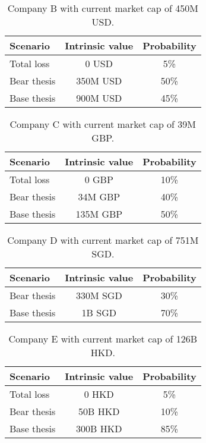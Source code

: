 \documentclass{article}
\begin{document}
\begin{table}[!b]
\caption{Company B with current market cap of 450M USD.}
\vspace{0.25cm}
\centering
\begin{tabular}{l|c|c}
Scenario & Intrinsic value & Probability \\
\hline
Total loss& 0 USD & 5\% \\
Bear thesis & 350M USD & 50\% \\
Base thesis & 900M USD & 45\% \\
\end{tabular}%
\label{tab:companyB}%
\end{table}%

\begin{table}[!b]
\caption{Company C with current market cap of 39M GBP.}
\vspace{0.25cm}
\centering
\begin{tabular}{l|c|c}
Scenario & Intrinsic value & Probability \\
\hline
Total loss & 0 GBP & 10\% \\
Bear thesis & 34M GBP & 40\% \\
Base thesis & 135M GBP & 50\% \\
\end{tabular}%
\label{tab:companyC}%
\end{table}%

\begin{table}[!b]
\caption{Company D with current market cap of 751M SGD.}
\vspace{0.25cm}
\centering
\begin{tabular}{l|c|c}
Scenario & Intrinsic value & Probability \\
\hline
Bear thesis & 330M SGD & 30\% \\
Base thesis & 1B SGD & 70\% \\
\end{tabular}%
\label{tab:companyD}%
\end{table}%

\begin{table}[!b]
\caption{Company E with current market cap of 126B HKD.}
\vspace{0.25cm}
\centering
\begin{tabular}{l|c|c}
Scenario & Intrinsic value & Probability \\
\hline
Total loss & 0 HKD & 5\% \\
Bear thesis & 50B HKD & 10\% \\
Base thesis & 300B HKD & 85\% \\
\end{tabular}%
\label{tab:companyE}%
\end{table}%
\end{document}
